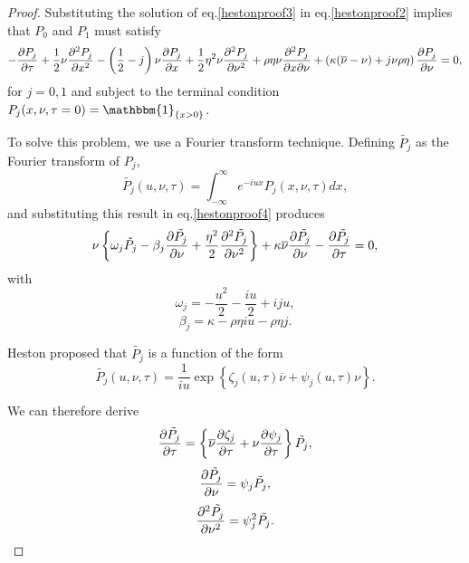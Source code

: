 \begin{proof}
Substituting the solution of eq.\eqref{hestonproof3} in eq.\eqref{hestonproof2} implies that $P_0$ and $P_1$ must satisfy
\begin{equation}\label{hestonproof4}
-\pdv{P_j}{\tau}+\frac{1}{2}\nu\pdv[2]{P_j}{x}-\left(\frac{1}{2}-j\right)\nu\pdv{P_j}{x}+\frac{1}{2}\eta^2\nu\pdv[2]{P_j}{\nu}+\rho\eta\nu\pdv{P_j}{x}{\nu}+\left(\kappa(\overline{\nu}-\nu)+j\nu\rho\eta\right)\pdv{P_j}{\nu}=0,
\end{equation}
\noindent for $j=0,1$ and subject to the terminal condition $P_j(x,\nu,\tau=0)=\mathbbm{1}_{\left\{x>0\right\}}$.


To solve this problem, we use a Fourier transform technique. Defining $\tilde{P_j}$ as the Fourier transform of $P_j$,
\begin{equation}
\tilde{P_j}(u,\nu,\tau)=\int_{-\infty}^{\infty}e^{-iux}P_j(x,\nu,\tau)dx,
\end{equation}
\noindent and substituting this result in eq.\eqref{hestonproof4} produces
\begin{equation}\label{hestonproof5}
\nu\left\{\omega_j\tilde{P_j}-\beta_j\pdv{\tilde{P_j}}{\nu}+\frac{\eta^2}{2}\pdv[2]{\tilde{P_j}}{\nu}\right\}+\kappa\overline{\nu}\pdv{\tilde{P_j}}{\nu}-\pdv{\tilde{P_j}}{\tau}=0,
\end{equation}
\noindent with
\begin{equation}
\omega_j=-\frac{u^2}{2}-\frac{iu}{2}+iju,
\end{equation}
\begin{equation}
\beta_j=\kappa-\rho\eta iu-\rho\eta j.
\end{equation}


Heston proposed that $\tilde{P_j}$ is a function of the form
\begin{equation}
\tilde{P_j}(u,\nu,\tau)=\frac{1}{iu}\exp\left\{\zeta_j(u,\tau)\overline{\nu}+\psi_j(u,\tau)\nu\right\}.
\end{equation}

We can therefore derive
\begin{equation}
\pdv{\tilde{P_j}}{\tau}=\left\{\overline{\nu}\pdv{\zeta_j}{\tau}+\nu\pdv{\psi_j}{\tau}\right\}\tilde{P_j},
\end{equation}
\begin{equation}
\pdv{\tilde{P_j}}{\nu}=\psi_j\tilde{P_j},
\end{equation}
\begin{equation}
\pdv[2]{\tilde{P_j}}{\nu}=\psi_j^2\tilde{P_j}.
\end{equation}


\end{proof}
